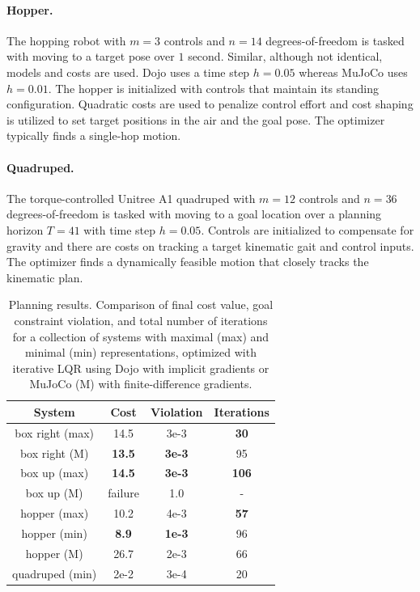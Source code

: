 \paragraph{Hopper.} The hopping robot \cite{raibert1989dynamically} with $m = 3$ controls and $n = 14$ degrees-of-freedom is tasked with moving to a target pose over $1$ second. Similar, although not identical, models and costs are used. Dojo uses a time step $h = 0.05$ whereas MuJoCo uses $h = 0.01$. The hopper is initialized with controls that maintain its standing configuration. Quadratic costs are used to penalize control effort and cost shaping is utilized to set target positions in the air and the goal pose. The optimizer typically finds a single-hop motion.

\paragraph{Quadruped.} The torque-controlled Unitree A1 quadruped \cite{unitree2022a1} with $m = 12$ controls and $n = 36$ degrees-of-freedom is tasked with moving to a goal location over a planning horizon $T = 41$ with time step $h = 0.05$. Controls are initialized to compensate for gravity and there are costs on tracking a target kinematic gait and control inputs. The optimizer finds a dynamically feasible motion that closely tracks the kinematic plan.

\begin{table}[H]
	\centering
	\caption[Numerical planning results for box, hopper, and quadruped]{Planning results. Comparison of final cost value, goal constraint violation, and total number of iterations for a collection of systems with maximal (max) and minimal (min) representations, optimized with iterative LQR \cite{li2004iterative} using Dojo with implicit gradients or MuJoCo (M) with finite-difference gradients.}
	\begin{tabular}{c c c c}
		\toprule
		\textbf{System} & \textbf{Cost} & \textbf{Violation} & \textbf{Iterations}\\
		\toprule
		box right (max) & 14.5 & 3e{-}3 & \textbf{30} \\
		box right (M) & \textbf{13.5} & \textbf{3e{-}3} & 95 \\
		\hline
		box up (max) & \textbf{14.5} & \textbf{3e{-}3} & \textbf{106} \\
		box up (M) & \mbox{failure} & 1.0 & -\\
		\hline
		hopper (max) & 10.2 & 4e{-}3 & \textbf{57} \\
		hopper (min) & \textbf{8.9} & \textbf{1e{-}3} & 96 \\
		hopper (M) & 26.7 & 2e{-}3 & 66 \\
		\hline
		quadruped (min) & 2e{-}2 & 3e{-}4 & 20 \\
		\toprule
	\end{tabular}
	\label{dojo_trajopt_results}
\end{table}

